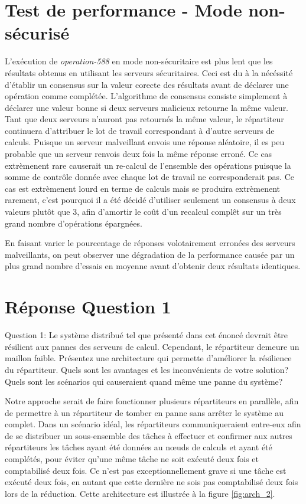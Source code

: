 \section{Test de performance - Mode non-sécurisé}

L'exécution de \emph{operation-588} en mode non-sécuritaire est plus lent que les résultats obtenus en utilisant les serveurs sécuritaires. Ceci est du à la nécéssité d'établir un consensus sur la valeur corecte des résultats avant de déclarer une opération comme complétée. L'algorithme de consensus consiste simplement à déclarer une valeur bonne si deux serveurs malicieux retourne la même valeur. Tant que deux serveurs n'auront pas retournés la même valeur, le répartiteur continuera d'attribuer le lot de travail correspondant à d'autre serveurs de calculs. Puisque un serveur malveillant envois une réponse aléatoire, il es peu probable que un serveur renvois deux fois la même réponse erroné. Ce cas extrèmenent rare causerait un re-calcul de l'ensemble des opérations puisque la somme de contrôle donnée avec chaque lot de travail ne corresponderait pas. Ce cas est extrèmenent lourd en terme de calculs mais se produira extrèmenent rarement, c'est pourquoi il a été décidé d'utiliser seulement un consensus à deux valeurs plutôt que 3, afin d'amortir le coût d'un recalcul complêt sur un très grand nombre d'opérations épargnées.

En faisant varier le pourcentage de réponses volotairement erronées des serveurs malveillants, on peut observer une dégradation de la performance causée par un plus grand nombre d'essais en moyenne avant d'obtenir deux résultats identiques. 

\section{Réponse Question 1}
Question 1: Le système distribué tel que présenté dans cet énoncé devrait être résilient aux pannes
des serveurs de calcul. Cependant, le répartiteur demeure un maillon faible. Présentez une
architecture qui permette d'améliorer la résilience du répartiteur. Quels sont les avantages et les
inconvénients de votre solution? Quels sont les scénarios qui causeraient quand même une panne du
système?

Notre approche serait de faire fonctionner plusieurs répartiteurs en parallèle, afin de permettre à 
un répartiteur de tomber en panne sans arrêter le système au complet. Dans un scénario idéal, les répartiteurs 
communiqueraient entre-eux afin de se distribuer un sous-ensemble des tâches à effectuer et confirmer aux autres répartiteurs 
les tâches ayant été données au nœuds de calculs et ayant été complétés, pour éviter qu'une même tâche ne soit exécuté deux fois
et comptabilisé deux fois. Ce n'est pas exceptionnellement grave si une tâche est exécuté deux fois, en autant que cette dernière ne sois 
pas comptabilisé deux fois lors de la réduction. Cette architecture est illustrée à la figure  \ref{fig:arch_2}.

